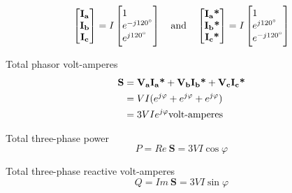 \documentclass[a4paper,numbers=noenddot,12pt]{scrbook}
\begin{document}
        \begin{equation}
            \begin{bmatrix}
                \mathbf{I_a} \\ \mathbf{I_b} \\ \mathbf{I_c}
            \end{bmatrix}
            = I
            \begin{bmatrix*}[l]
                1 \\ e^{- j 120^\circ} \\ e^{j 120^\circ}
            \end{bmatrix*}
            \quad \text{and} \quad
            \begin{bmatrix}
                \mathbf{I_a \text{\bfseries *}} \\ \mathbf{I_b \text{\bfseries *}} \\ \mathbf{I_c \text{\bfseries *}}
            \end{bmatrix}
            = I
            \begin{bmatrix*}[l]
                1 \\ e^{j 120^\circ} \\ e^{- j 120^\circ}
            \end{bmatrix*}
            \label{eq:Eq1.30}
        \end{equation}

        Total phasor volt-amperes
        \begin{align}
            \mathbf{S} & = \mathbf{V_a}\mathbf{I_a \text{\bfseries *}} + \mathbf{V_b}\mathbf{I_b \text{\bfseries *}} + \mathbf{V_c}\mathbf{I_c \text{\bfseries *}} \nonumber \\
            & = V I (e^{j\varphi} + e^{j \varphi} + e^{j \varphi}) \nonumber \\
            & = 3 V I e^{j\varphi} \text{volt-amperes}
            \label{eq:Eq1.31}
        \end{align}

        Total three-phase power
        \begin{equation}
            P = Re\ \mathbf{S} = 3 V I \cos \varphi
            \label{eq:Eq1.32}
        \end{equation}

        Total three-phase reactive volt-amperes
        \begin{equation}
            Q = Im\ \mathbf{S} = 3 V I \sin \varphi
            \label{eq:Eq1.33}
        \end{equation}
\end{document}
